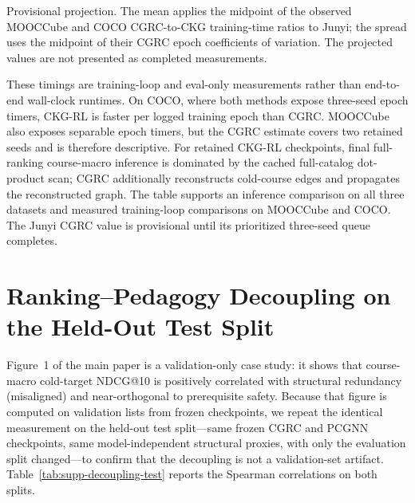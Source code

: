 \documentclass[letterpaper]{article}
\begin{document}
\noindent\footnotesize
Provisional projection. The mean applies the midpoint of the
observed MOOCCube and COCO CGRC-to-CKG training-time ratios to Junyi; the spread
uses the midpoint of their CGRC epoch coefficients of variation. The projected
values are not presented as completed measurements.
\normalsize

These timings are training-loop and eval-only measurements rather than
end-to-end wall-clock runtimes. On COCO, where both methods expose three-seed
epoch timers, CKG-RL is faster per logged training epoch than CGRC. MOOCCube
also exposes separable epoch timers, but the CGRC estimate covers two retained
seeds and is therefore descriptive. For retained CKG-RL checkpoints, final
full-ranking course-macro inference is dominated by the cached full-catalog
dot-product scan; CGRC additionally reconstructs cold-course edges and
propagates the reconstructed graph. The table supports an inference comparison
on all three datasets and measured training-loop comparisons on MOOCCube and
COCO. The Junyi CGRC value is provisional until its prioritized
three-seed queue completes.

\section{Ranking--Pedagogy Decoupling on the Held-Out Test Split}
Figure~1 of the main paper is a validation-only case study: it shows that
course-macro cold-target NDCG@10 is positively correlated with structural
redundancy (misaligned) and near-orthogonal to prerequisite safety. Because
that figure is computed on validation lists from frozen checkpoints, we repeat
the identical measurement on the held-out test split---same frozen CGRC and
PCGNN checkpoints, same model-independent structural proxies, with only the
evaluation split changed---to confirm that the decoupling is not a
validation-set artifact. Table~\ref{tab:supp-decoupling-test} reports the
Spearman correlations on both splits.
\end{document}
